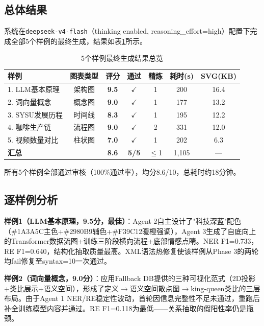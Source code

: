 \documentclass[11pt,a4paper]{article}
\begin{document}
\subsection{总体结果}

系统在\texttt{deepseek-v4-flash}（thinking enabled, reasoning\_effort=high）配置下完成全部5个样例的最终生成，结果如表\ref{tab:overall}所示。

\begin{table}[H]
\centering
\caption{5个样例最终生成结果总览}
\label{tab:overall}
\begin{tabular}{lcccccc}
\toprule
样例 & 图表类型 & 评分 & 通过 & 精炼 & 耗时(s) & SVG(KB) \\
\midrule
1. LLM基本原理 & 架构图 & \textbf{9.5} & $\checkmark$ & 1 & 200 & 16.4 \\
2. 词向量概念 & 概念图 & \textbf{9.0} & $\checkmark$ & 1 & 177 & 13.2 \\
3. SYSU发展历程 & 时间线 & \textbf{8.3} & $\checkmark$ & 1 & 195 & 12.2 \\
4. 咖啡生产链 & 流程图 & \textbf{9.0} & $\checkmark$ & 2 & 331 & 12.0 \\
5. 视频数量对比 & 柱状图 & \textbf{7.0} & $\checkmark$ & 1 & 202 & 6.3 \\
\midrule
\multicolumn{2}{l}{\textbf{汇总}} & \textbf{8.6} & \textbf{5/5} & $\le$1 & 1,105 & — \\
\bottomrule
\end{tabular}
\end{table}

所有5个样例全部通过审核（100\%通过率），均分8.6/10，总耗时约18分钟。

\subsection{逐样例分析}

\textbf{样例1（LLM基本原理，9.5分，最佳）}：Agent 2自主设计了"科技深蓝"配色（\#1A3A5C主色+\#2980B9辅色+\#F39C12暖橙强调），Agent 3生成了自底向上的Transformer数据流图+训练三阶段横向流程+底部情感点睛。NER F1=0.733，RE F1=0.640，结构化抽取质量最高。XML语法热修复使该样例从Phase 3的两轮均fail修复至syntax=10一次通过。

\textbf{样例2（词向量概念，9.0分）}：应用Fallback DB提供的三种可视化范式（2D投影+类比展示+语义空间），形成了定义$\rightarrow$语义空间散点图$\rightarrow$king-queen类比的三层布局。由于Agent 1 NER/RE稳定性波动，首轮因信息完整性不足未通过，重跑后补全训练模型内容并通过。RE F1=0.118为最低——关系抽取的假阳性率仍是瓶颈。
\end{document}
